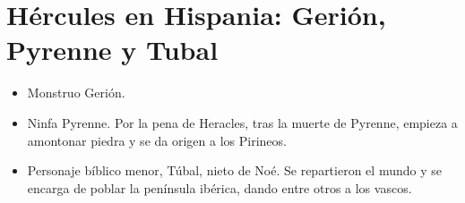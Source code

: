 \section{Hércules en Hispania: Gerión, Pyrenne y Tubal}
\begin{itemize}
	\item Monstruo Gerión.
	\item Ninfa Pyrenne. Por la pena de Heracles, tras la muerte de Pyrenne, empieza a amontonar piedra y se da origen a los Pirineos.
	\item Personaje bíblico menor, Túbal, nieto de Noé. Se repartieron el mundo y se encarga de poblar la península ibérica, dando entre otros a los vascos.
\end{itemize}